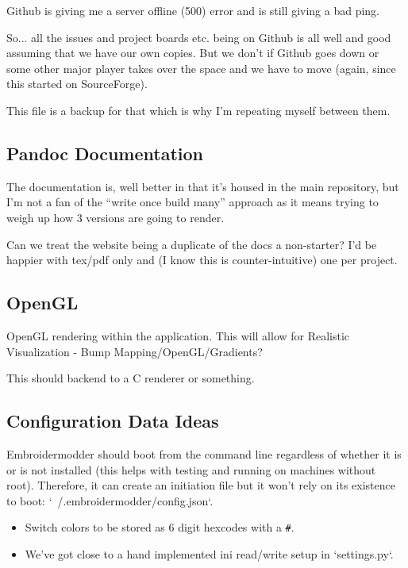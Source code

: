 \documentclass{report}
\begin{document}
Github is giving me a server offline (500) error and is still giving a bad ping.

So... all the issues and project boards etc. being on Github is all well and good assuming that we have our own copies. But we don't if Github goes down or some other major player takes over the space and we have to move (again, since this started on SourceForge).

This file is a backup for that which is why I'm repeating myself between them.

\subsection{Pandoc Documentation}

The documentation is, well better in that it's housed in the main repository,
but I'm not a fan of the ``write once build many'' approach as it means
trying to weigh up how 3 versions are going to render.

Can we treat the website being a duplicate of the docs a non-starter?
I'd be happier with tex/pdf only and (I know this is counter-intuitive) one
per project.

\subsection{OpenGL}

OpenGL rendering within the application. This will allow for
Realistic Visualization - Bump Mapping/OpenGL/Gradients?

This should backend to a C renderer or something.

\subsection{Configuration Data Ideas}

Embroidermodder should boot from the command line
regardless of whether it is or is not installed (this helps with testing and
running on machines without root). Therefore, it can create an initiation file
but it won't rely on its existence to boot: `~/.embroidermodder/config.json`.

\begin{itemize}
\item Switch colors to be stored as 6 digit hexcodes with a \texttt{\#}.
\item We've got close to a hand implemented ini read/write setup in `settings.py`.
\end{itemize}
\end{document}
